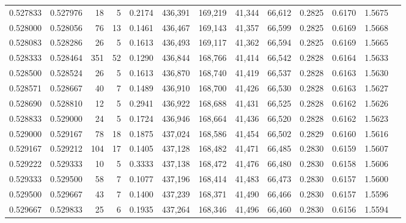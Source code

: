 \begin{tabular}{rrrrrrrrrrrrr}
0.527833 & 0.527976 &    18 &   5 &                                     0.2174 & 436,391 & 169,219 &  41,344 &  66,612 & 0.2825 & 0.6170 & 1.5675 \\
0.528000 & 0.528056 &    76 &  13 &                                     0.1461 & 436,467 & 169,143 &  41,357 &  66,599 & 0.2825 & 0.6169 & 1.5668 \\
0.528083 & 0.528286 &    26 &   5 &                                     0.1613 & 436,493 & 169,117 &  41,362 &  66,594 & 0.2825 & 0.6169 & 1.5665 \\
0.528333 & 0.528464 &   351 &  52 &                                     0.1290 & 436,844 & 168,766 &  41,414 &  66,542 & 0.2828 & 0.6164 & 1.5633 \\
0.528500 & 0.528524 &    26 &   5 &                                     0.1613 & 436,870 & 168,740 &  41,419 &  66,537 & 0.2828 & 0.6163 & 1.5630 \\
0.528571 & 0.528667 &    40 &   7 &                                     0.1489 & 436,910 & 168,700 &  41,426 &  66,530 & 0.2828 & 0.6163 & 1.5627 \\
0.528690 & 0.528810 &    12 &   5 &                                     0.2941 & 436,922 & 168,688 &  41,431 &  66,525 & 0.2828 & 0.6162 & 1.5626 \\
0.528833 & 0.529000 &    24 &   5 &                                     0.1724 & 436,946 & 168,664 &  41,436 &  66,520 & 0.2828 & 0.6162 & 1.5623 \\
0.529000 & 0.529167 &    78 &  18 &                                     0.1875 & 437,024 & 168,586 &  41,454 &  66,502 & 0.2829 & 0.6160 & 1.5616 \\
0.529167 & 0.529212 &   104 &  17 &                                     0.1405 & 437,128 & 168,482 &  41,471 &  66,485 & 0.2830 & 0.6159 & 1.5607 \\
0.529222 & 0.529333 &    10 &   5 &                                     0.3333 & 437,138 & 168,472 &  41,476 &  66,480 & 0.2830 & 0.6158 & 1.5606 \\
0.529333 & 0.529500 &    58 &   7 &                                     0.1077 & 437,196 & 168,414 &  41,483 &  66,473 & 0.2830 & 0.6157 & 1.5600 \\
0.529500 & 0.529667 &    43 &   7 &                                     0.1400 & 437,239 & 168,371 &  41,490 &  66,466 & 0.2830 & 0.6157 & 1.5596 \\
0.529667 & 0.529833 &    25 &   6 &                                     0.1935 & 437,264 & 168,346 &  41,496 &  66,460 & 0.2830 & 0.6156 & 1.5594 \\

\end{tabular}
